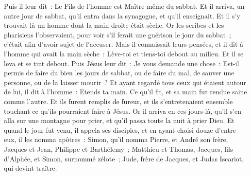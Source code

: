 \begin{multicols}{2}
Puis il leur dit~: Le Fils de l'homme est Maître même du sabbat.
Et il arriva, un autre jour de sabbat, qu'il entra dans la synagogue, et qu'il enseignait. Et il s'y trouvait là un homme dont la main droite était sèche.
Or les scribes et les pharisiens l'observaient, pour voir s'il ferait une guérison le jour du sabbat~; c'était afin d'avoir sujet de l'accuser.
Mais il connaissait leurs pensées, et il dit à l'homme qui avait la main sèche~: Lève-toi et tiens-toi debout au milieu. Et il se leva et se tint debout.
Puis Jésus leur dit~: Je vous demande une chose~: Est-il permis de faire du bien les jours de sabbat, ou de faire du mal, de sauver une personne, ou de la laisser mourir~?
Et ayant regardé tous ceux qui étaient autour de lui, il dit à l'homme~: Etends ta main. Ce qu'il fit, et sa main fut rendue saine comme l'autre.
Et ils furent remplis de fureur, et ils s'entretenaient ensemble touchant ce qu'ils pourraient faire à Jésus.
Or il arriva en ces jours-là, qu'il s'en alla sur une montagne pour prier, et qu'il passa toute la nuit à prier Dieu.
Et quand le jour fut venu, il appela ses disciples, et en ayant choisi douze d'entre eux, il les nomma apôtres~:
Simon, qu'il nomma Pierre, et André son frère, Jacques et Jean, Philippe et Barthélemy~;
Matthieu et Thomas, Jacques, fils d'Alphée, et Simon, surnommé zélote~;
Jude, frère de Jacques, et Judas Iscariot, qui devint traître.

\end{multicols}
